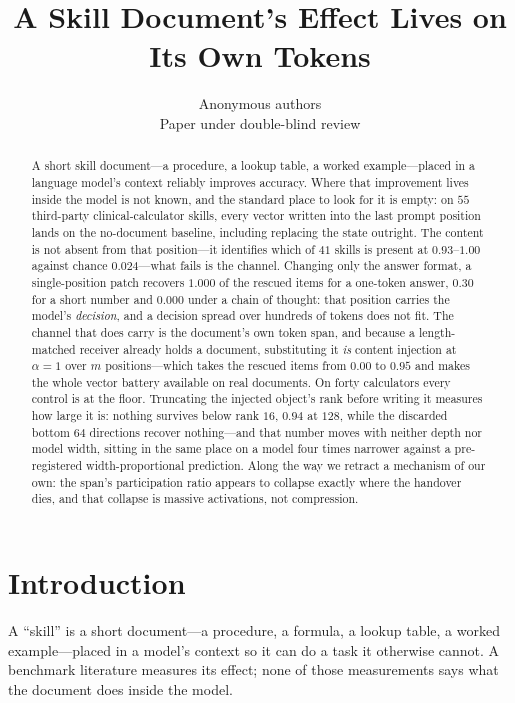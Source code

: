 \documentclass{article}
\title{A Skill Document's Effect Lives on Its Own Tokens}
\author{Anonymous authors \\
Paper under double-blind review}
\begin{document}
\maketitle

\begin{abstract}
A short skill document---a procedure, a lookup table, a worked example---placed
in a language model's context reliably improves accuracy. Where that improvement
lives inside the model is not known, and the standard place to look for it is
empty: on $55$ third-party clinical-calculator skills, every vector written into
the last prompt position lands on the no-document baseline, including replacing
the state outright. The content is not absent from that position---it identifies
which of $41$ skills is present at $0.93$--$1.00$ against chance $0.024$---what
fails is the channel. Changing only the answer format, a single-position patch
recovers $1.000$ of the rescued items for a one-token answer, $0.30$ for a short
number and $\mathbf{0.000}$ under a chain of thought: that position carries the
model's \emph{decision}, and a decision spread over hundreds of tokens does not
fit. The channel that does carry is the document's own token span, and because a
length-matched receiver already holds a document, substituting it \emph{is}
content injection at $\alpha=1$ over $m$ positions---which takes the rescued
items from $0.00$ to $0.95$ and makes the whole vector battery available on real
documents. On forty calculators every control is at the floor.
Truncating the injected object's rank before writing it measures how large it
is: nothing survives below rank $16$, $0.94$ at $128$, while the discarded
bottom $64$ directions recover nothing---and that number moves with neither
depth nor model width, sitting in the same place on a model four times narrower
against a pre-registered width-proportional prediction. Along the way we retract
a mechanism of our own: the span's participation ratio appears to collapse
exactly where the handover dies, and that collapse is massive activations, not
compression.
\end{abstract}

\section{Introduction}

A ``skill'' is a short document---a procedure, a formula, a lookup table, a
worked example---placed in a model's context so it can do a task it otherwise
cannot. A benchmark literature measures its effect; none of those measurements
says what the document does inside the model.
\end{document}
